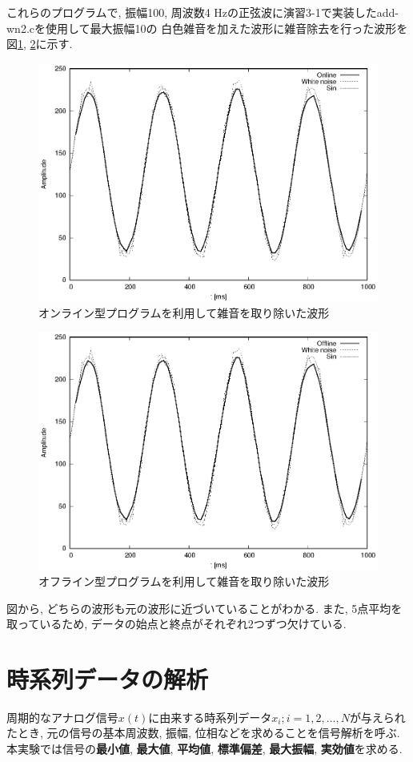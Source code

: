 \documentclass[titlepage]{jsarticle}
\begin{document}
        これらのプログラムで, 振幅100, 周波数4 Hzの正弦波に演習3-1で実装したadd-wn2.cを使用して最大振幅10の
        白色雑音を加えた波形に雑音除去を行った波形を図\ref{fig:mvave1}, \ref{fig:mvave2}に示す.

        \begin{figure}[h]
            \centering
            \includegraphics[width=0.8\hsize]{images/mvave5-1.eps}
            \caption{オンライン型プログラムを利用して雑音を取り除いた波形}
            \label{fig:mvave1}
        \end{figure}

        \begin{figure}[h]
            \centering
            \includegraphics[width=0.8\hsize]{images/mvave5-2.eps}
            \caption{オフライン型プログラムを利用して雑音を取り除いた波形}
            \label{fig:mvave2}
        \end{figure}

        図から, どちらの波形も元の波形に近づいていることがわかる.
        また, 5点平均を取っているため, データの始点と終点がそれぞれ2つずつ欠けている.

\section{時系列データの解析}
    周期的なアナログ信号$x(t)$に由来する時系列データ$x_i;i=1,2,\dots,N$が与えられたとき,
    元の信号の基本周波数, 振幅, 位相などを求めることを信号解析を呼ぶ.
    本実験では信号の\textbf{最小値}, \textbf{最大値}, \textbf{平均値}, \textbf{標準偏差}, \textbf{最大振幅}, \textbf{実効値}を求める.
\end{document}
